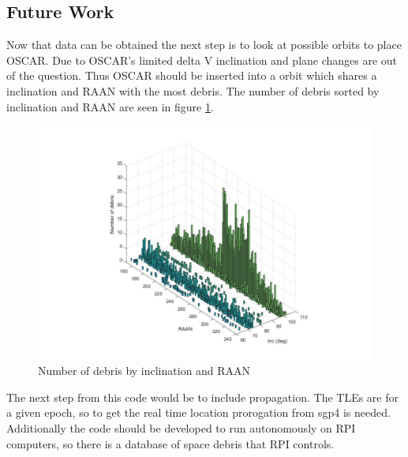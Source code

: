 \documentclass[12pt]{article}
\begin{document}
	
	


\subsection{Future Work}

Now that data can be obtained the next step is to look at possible orbits to place OSCAR. Due to OSCAR's limited delta V inclination and plane changes are out of the question. Thus OSCAR should be inserted into a orbit which shares a inclination and RAAN with the most debris. The number of debris sorted by inclination and RAAN are seen in figure \ref{fig:ranninc}.

\begin{figure}[H]
	\centering
	\includegraphics[width=0.7\linewidth]{rann_inc}
	\caption{Number of debris by inclination and RAAN}
	\label{fig:ranninc}
\end{figure}


The next step from this code would be to include propagation. The TLEs are for a given epoch, so to get the real time location prorogation from sgp4 is needed. Additionally the code should be developed to run autonomously on RPI computers, so there is a database of space debris that RPI controls.


	
		
		
\end{document}
